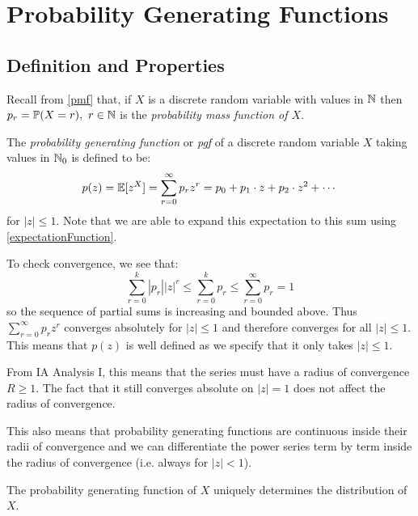 \documentclass[../main.tex]{subfiles}
\begin{document}
\section{Probability Generating Functions}
\label{probabilityGeneratingFunctions}
\subsection{Definition and Properties}
\begin{remark}[Recap]
  Recall from \cref{pmf} that, if $X$ is a discrete random variable with values in $\mathbb{N}$ then $p_r = \mathbb{P}(X = r),\ r \in \mathbb{N}$ is the \textit{probability mass function of $X$}.
\end{remark}
\begin{definition}
  The \textit{probability generating function} or \textit{pgf} of a discrete random variable $X$ taking values in $\mathbb{N}_0$ is defined to be:
  \label{pgfDefinition}
  \[
    p(z) = \mathbb{E}[z^{X}] = \sum_{r = 0}^{\infty} p_r z^{r} = p_0 + p_1 \cdot z + p_2 \cdot z^2 + \cdots
  \]
  for $|z| \leq 1$.
  Note that we are able to expand this expectation to this sum using \cref{expectationFunction}.
\end{definition}
To check convergence, we see that:
\[
  \sum_{r = 0}^{k} |p_r||z|^{r} \leq \sum_{r = 0}^{k} p_r \leq \sum_{r = 0}^{\infty} p_r = 1
\]
so the sequence of partial sums is increasing and bounded above.
Thus $\sum_{r = 0}^{\infty} p_r z^r$ converges absolutely for $|z| \leq 1$ and therefore converges for all $|z| \leq 1$.
This means that $p(z)$ is well defined as we specify that it only takes $|z| \leq 1$.
\begin{remark}
  From IA Analysis I, this means that the series must have a radius of convergence $R \geq 1$.
  The fact that it still converges absolute on $|z| = 1$ does not affect the radius of convergence.

  This also means that probability generating functions are continuous inside their radii of convergence and we can differentiate the power series term by term inside the radius of convergence (i.e. always for $|z| < 1$).
\end{remark}
\begin{theorem}
  The probability generating function of $X$ uniquely determines the distribution of $X$.
\end{theorem}
\end{document}
